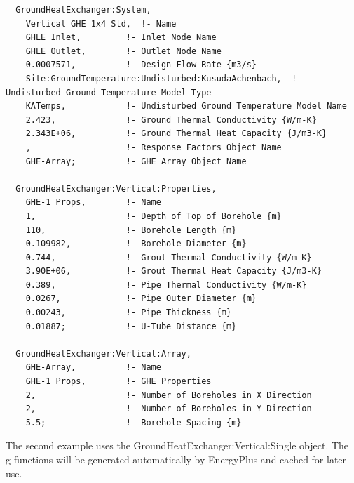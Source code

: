 \begin{lstlisting}
  GroundHeatExchanger:System,
    Vertical GHE 1x4 Std,  !- Name
    GHLE Inlet,         !- Inlet Node Name
    GHLE Outlet,        !- Outlet Node Name
    0.0007571,          !- Design Flow Rate {m3/s}
    Site:GroundTemperature:Undisturbed:KusudaAchenbach,  !- Undisturbed Ground Temperature Model Type
    KATemps,            !- Undisturbed Ground Temperature Model Name
    2.423,              !- Ground Thermal Conductivity {W/m-K}
    2.343E+06,          !- Ground Thermal Heat Capacity {J/m3-K}
    ,                   !- Response Factors Object Name
    GHE-Array;          !- GHE Array Object Name

  GroundHeatExchanger:Vertical:Properties,
    GHE-1 Props,        !- Name
    1,                  !- Depth of Top of Borehole {m}
    110,                !- Borehole Length {m}
    0.109982,           !- Borehole Diameter {m}
    0.744,              !- Grout Thermal Conductivity {W/m-K}
    3.90E+06,           !- Grout Thermal Heat Capacity {J/m3-K}
    0.389,              !- Pipe Thermal Conductivity {W/m-K}
    0.0267,             !- Pipe Outer Diameter {m}
    0.00243,            !- Pipe Thickness {m}
    0.01887;            !- U-Tube Distance {m}

  GroundHeatExchanger:Vertical:Array,
    GHE-Array,          !- Name
    GHE-1 Props,        !- GHE Properties
    2,                  !- Number of Boreholes in X Direction
    2,                  !- Number of Boreholes in Y Direction
    5.5;                !- Borehole Spacing {m}
\end{lstlisting}

The second example uses the GroundHeatExchanger:Vertical:Single object. The g-functions will be generated automatically by EnergyPlus and cached for later use.

